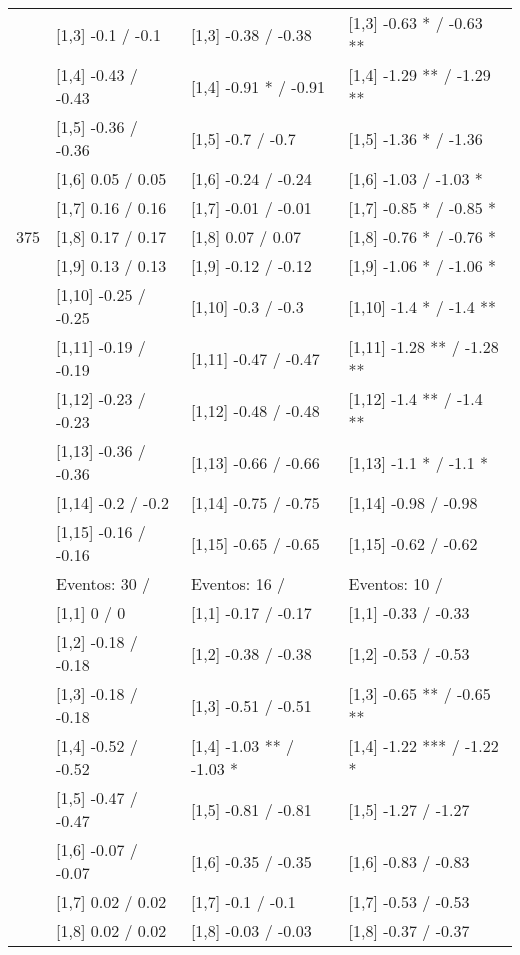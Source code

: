 \begin{table}
\begin{tabular}[t]{llll}
 & {}[1,3] -0.1  / -0.1 & {}[1,3] -0.38  / -0.38 & {}[1,3] -0.63 * / -0.63 **\\
\addlinespace
 & {}[1,4] -0.43  / -0.43 & {}[1,4] -0.91 * / -0.91 & {}[1,4] -1.29 ** / -1.29 **\\
 & {}[1,5] -0.36  / -0.36 & {}[1,5] -0.7  / -0.7 & {}[1,5] -1.36 * / -1.36\\
 & {}[1,6] 0.05  / 0.05 & {}[1,6] -0.24  / -0.24 & {}[1,6] -1.03  / -1.03 *\\
 & {}[1,7] 0.16  / 0.16 & {}[1,7] -0.01  / -0.01 & {}[1,7] -0.85 * / -0.85 *\\
375 & {}[1,8] 0.17  / 0.17 & {}[1,8] 0.07  / 0.07 & {}[1,8] -0.76 * / -0.76 *\\
\addlinespace
 & {}[1,9] 0.13  / 0.13 & {}[1,9] -0.12  / -0.12 & {}[1,9] -1.06 * / -1.06 *\\
 & {}[1,10] -0.25  / -0.25 & {}[1,10] -0.3  / -0.3 & {}[1,10] -1.4 * / -1.4 **\\
 & {}[1,11] -0.19  / -0.19 & {}[1,11] -0.47  / -0.47 & {}[1,11] -1.28 ** / -1.28 **\\
 & {}[1,12] -0.23  / -0.23 & {}[1,12] -0.48  / -0.48 & {}[1,12] -1.4 ** / -1.4 **\\
 & {}[1,13] -0.36  / -0.36 & {}[1,13] -0.66  / -0.66 & {}[1,13] -1.1 * / -1.1 *\\
\addlinespace
 & {}[1,14] -0.2  / -0.2 & {}[1,14] -0.75  / -0.75 & {}[1,14] -0.98  / -0.98\\
 & {}[1,15] -0.16  / -0.16 & {}[1,15] -0.65  / -0.65 & {}[1,15] -0.62  / -0.62\\
 & Eventos:  30 / & Eventos:  16 / & Eventos:  10 /\\
 & {}[1,1] 0  / 0 & {}[1,1] -0.17  / -0.17 & {}[1,1] -0.33  / -0.33\\
 & {}[1,2] -0.18  / -0.18 & {}[1,2] -0.38  / -0.38 & {}[1,2] -0.53  / -0.53\\
\addlinespace
 & {}[1,3] -0.18  / -0.18 & {}[1,3] -0.51  / -0.51 & {}[1,3] -0.65 ** / -0.65 **\\
 & {}[1,4] -0.52  / -0.52 & {}[1,4] -1.03 ** / -1.03 * & {}[1,4] -1.22 *** / -1.22 *\\
 & {}[1,5] -0.47  / -0.47 & {}[1,5] -0.81  / -0.81 & {}[1,5] -1.27  / -1.27\\
 & {}[1,6] -0.07  / -0.07 & {}[1,6] -0.35  / -0.35 & {}[1,6] -0.83  / -0.83\\
 & {}[1,7] 0.02  / 0.02 & {}[1,7] -0.1  / -0.1 & {}[1,7] -0.53  / -0.53\\
\addlinespace
500 & {}[1,8] 0.02  / 0.02 & {}[1,8] -0.03  / -0.03 & {}[1,8] -0.37  / -0.37\\

\end{tabular}
\end{table}
